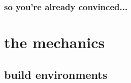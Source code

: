 \documentclass{beamer}
\begin{document}
\begin{frame}
  \frametitle{so you're already convinced...}

\end{frame}


\section{the mechanics}

\subsection{build environments}
\end{document}

